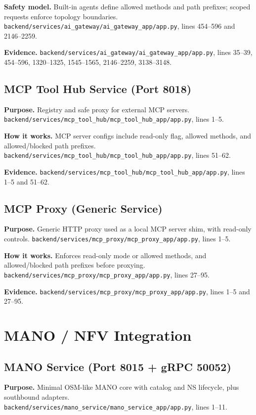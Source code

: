 \documentclass[conference]{IEEEtran}
\begin{document}
\textbf{Safety model.} Built-in agents define allowed methods and path prefixes; scoped requests enforce topology boundaries. \texttt{backend/services/ai\_gateway/ai\_gateway\_app/app.py}, lines 454--596 and 2146--2259.

\textbf{Evidence.} \texttt{backend/services/ai\_gateway/ai\_gateway\_app/app.py}, lines 35--39, 454--596, 1320--1325, 1545--1565, 2146--2259, 3138--3148.

\subsection{MCP Tool Hub Service (Port 8018)}
\textbf{Purpose.} Registry and safe proxy for external MCP servers. \texttt{backend/services/mcp\_tool\_hub/mcp\_tool\_hub\_app/app.py}, lines 1--5.

\textbf{How it works.} MCP server configs include read-only flag, allowed methods, and allowed/blocked path prefixes. \texttt{backend/services/mcp\_tool\_hub/mcp\_tool\_hub\_app/app.py}, lines 51--62.

\textbf{Evidence.} \texttt{backend/services/mcp\_tool\_hub/mcp\_tool\_hub\_app/app.py}, lines 1--5 and 51--62.

\subsection{MCP Proxy (Generic Service)}
\textbf{Purpose.} Generic HTTP proxy used as a local MCP server shim, with read-only controls. \texttt{backend/services/mcp\_proxy/mcp\_proxy\_app/app.py}, lines 1--5.

\textbf{How it works.} Enforces read-only mode or allowed methods, and allowed/blocked path prefixes before proxying. \texttt{backend/services/mcp\_proxy/mcp\_proxy\_app/app.py}, lines 27--95.

\textbf{Evidence.} \texttt{backend/services/mcp\_proxy/mcp\_proxy\_app/app.py}, lines 1--5 and 27--95.

\section{MANO / NFV Integration}

\subsection{MANO Service (Port 8015 + gRPC 50052)}
\textbf{Purpose.} Minimal OSM-like MANO core with catalog and NS lifecycle, plus southbound adapters. \texttt{backend/services/mano\_service/mano\_service\_app/app.py}, lines 1--11.
\end{document}
